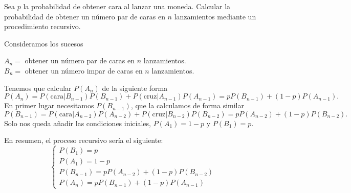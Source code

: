 \documentclass[twoside]{article}
\begin{document}
\newpage

\begin{ejercicio}{9}
Sea $p$ la probabilidad de obtener cara al lanzar una moneda. Calcular la probabilidad de
obtener un número par de caras en $n$ lanzamientos mediante un procedimiento recursivo.
\end{ejercicio}
\begin{solucion}
Consideramos los sucesos 

$A_n=$ obtener un número par de caras en $n$ lanzamientos.\\
$B_n=$ obtener un número impar de caras en $n$ lanzamientos.

Tenemos que calcular $P(A_n)$ de la siguiente forma
$$P(A_n)=P(\text{cara}|B_{n-1})P(B_{n-1})+P(\text{cruz}|A_{n-1})P(A_{n-1})=pP(B_{n-1})+(1-p)P(A_{n-1}).$$
En primer lugar necesitamos $P(B_{n-1})$, que la calculamos de forma similar
$$P(B_{n-1})=P(\text{cara}|A_{n-2})P(A_{n-2})+P(\text{cruz}|B_{n-2})P(B_{n-2})=pP(A_{n-2})+(1-p)P(B_{n-2}).$$
Solo nos queda añadir las condiciones iniciales, $P(A_1)=1-p$ y $P(B_1)=p$. 

En resumen, el proceso recursivo sería el siguiente:
$$\begin{cases}
P(B_1)=p\\
P(A_1)=1-p\\
P(B_{n-1})=pP(A_{n-2})+(1-p)P(B_{n-2})\\
P(A_n)=pP(B_{n-1})+(1-p)P(A_{n-1})
\end{cases}$$
\end{solucion}

\newpage
\end{document}
